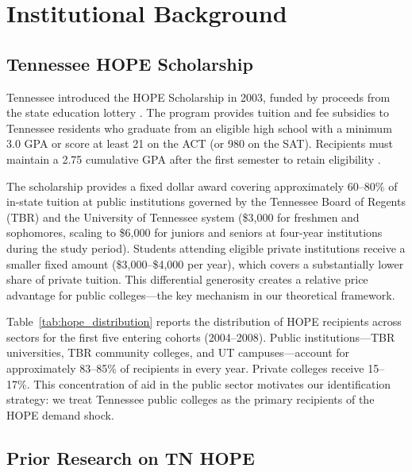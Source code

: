 
\section{Institutional Background}
\label{sec:background}

\subsection{Tennessee HOPE Scholarship}

Tennessee introduced the HOPE Scholarship in 2003, funded by proceeds
from the state education lottery \parencite{THEC2025}. The program provides tuition and fee
subsidies to Tennessee residents who graduate from an eligible high
school with a minimum 3.0 GPA or score at least 21 on the ACT (or 980
on the SAT). Recipients must maintain a 2.75 cumulative GPA after the
first semester to retain eligibility
\parencite{ness2008eligibility}.

The scholarship provides a fixed dollar award covering approximately
60--80\% of in-state tuition at public institutions governed by the
Tennessee Board of Regents (TBR) and the University of Tennessee system
(\$3,000 for freshmen and sophomores, scaling to \$6,000 for juniors and
seniors at four-year institutions during the study period). Students
attending eligible private institutions receive a smaller fixed amount
(\$3,000--\$4,000 per year), which covers a substantially lower share
of private tuition. This differential generosity creates a relative price advantage
for public colleges---the key mechanism in our theoretical framework.

Table~\ref{tab:hope_distribution} reports the distribution of HOPE
recipients across sectors for the first five entering cohorts
(2004--2008). Public institutions---TBR universities, TBR community
colleges, and UT campuses---account for approximately 83--85\% of
recipients in every year. Private colleges receive 15--17\%. This
concentration of aid in the public sector motivates our identification
strategy: we treat Tennessee public colleges as the primary recipients
of the HOPE demand shock.

\subsection{Prior Research on TN HOPE}

